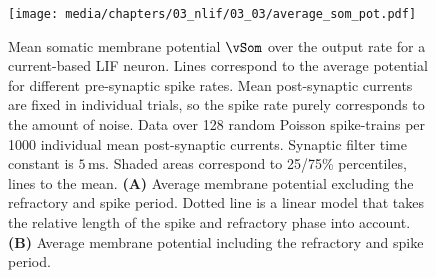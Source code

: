 \begin{figure}[p]
	\centering
	\texttt{[image: media/chapters/03\_nlif/03\_03/average\_som\_pot.pdf]}%
	{\label{fig:avg_vsom_a}}%
	{\label{fig:avg_vsom_b}}%
	\caption[Mean somatic membrane potential over the neuron output rate]{Mean somatic membrane potential $\vSom$ over the output rate for a current-based LIF neuron. Lines correspond to the average potential for different pre-synaptic spike rates.
	Mean post-synaptic currents are fixed in individual trials, so the spike rate purely corresponds to the amount of noise.
	Data over 128 random Poisson spike-trains per 1000 individual mean post-synaptic currents.
	Synaptic filter time constant is $5\,\mathrm{ms}$. Shaded areas correspond to 25/75\% percentiles, lines to the mean. \textbf{(A)} Average membrane potential excluding the refractory and spike period. Dotted line is a  linear model that takes the relative length of the spike and refractory phase into account. \textbf{(B)} Average membrane potential including the refractory and spike period.}
	\label{fig:avg_vsom}
\end{figure}

